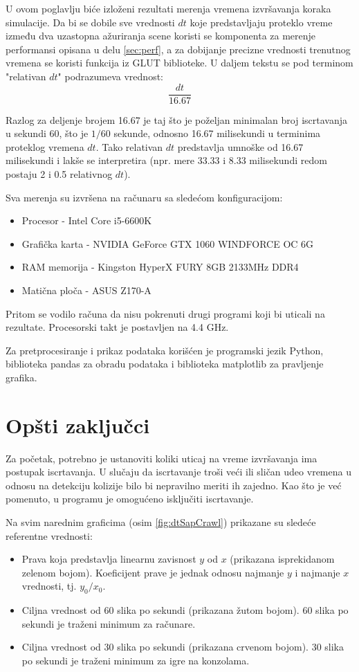\documentclass[12pt,oneside]{memoir}
\begin{document}
U ovom poglavlju biće izloženi rezultati merenja vremena izvršavanja koraka simulacije.
Da bi se dobile sve vrednosti $dt$ koje predstavljaju proteklo vreme između dva uzastopna ažuriranja scene
koristi se komponenta za merenje performansi opisana u delu \ref{sec:perf}, a za dobijanje precizne vrednosti trenutnog vremena se koristi funkcija iz GLUT biblioteke.
U daljem tekstu se pod terminom "relativan $dt$" podrazumeva vrednost:
$$ \frac{ dt }{16.67} $$

Razlog za deljenje brojem 16.67 je taj što je poželjan minimalan broj iscrtavanja u sekundi 60, 
što je $1/60$ sekunde, odnosno 16.67 milisekundi u terminima proteklog vremena $dt$.
Tako relativan $dt$ predstavlja umnoške od 16.67 milisekundi i lakše se interpretira
(npr. mere 33.33 i 8.33 milisekundi redom postaju 2 i 0.5 relativnog $dt$).

Sva merenja su izvršena na računaru sa sledećom konfiguracijom:
\begin{itemize}  
	\item Procesor - Intel Core i5-6600K 
	\item Grafička karta - NVIDIA GeForce GTX 1060 WINDFORCE OC 6G
	\item RAM memorija - Kingston HyperX FURY 8GB 2133MHz DDR4 
	\item Matična ploča - ASUS Z170-A
\end{itemize}  
Pritom se vodilo računa da nisu pokrenuti drugi programi koji bi uticali na rezultate.
Procesorski takt je postavljen na 4.4 GHz.

Za pretprocesiranje i prikaz podataka korišćen je programski jezik Python,
biblioteka pandas za obradu podataka i biblioteka matplotlib za pravljenje grafika.

\section{Opšti zaključci}

Za početak, potrebno je ustanoviti  koliki uticaj na vreme izvršavanja ima postupak iscrtavanja.
U slučaju da iscrtavanje troši veći ili sličan udeo vremena  u odnosu na detekciju kolizije bilo bi nepravilno meriti ih zajedno.
Kao što je već pomenuto, u programu je omogućeno isključiti iscrtavanje.

Na svim narednim graficima (osim \ref{fig:dtSapCrawl}) prikazane su sledeće referentne vrednosti:
\begin{itemize}  
	\item Prava koja predstavlja linearnu zavisnost $y$ od $x$ (prikazana isprekidanom zelenom bojom).
	Koeficijent prave je jednak odnosu najmanje $y$ i najmanje $x$ vrednosti, tj. $y_0/x_0$.
	\item Ciljna vrednost od 60 slika po sekundi (prikazana žutom bojom).
	60 slika po sekundi je traženi minimum za računare.
	\item Ciljna vrednost od 30 slika po sekundi (prikazana crvenom bojom).
	30 slika po sekundi je traženi minimum za igre na konzolama.
\end{itemize}  
\end{document}
